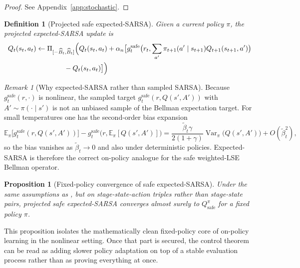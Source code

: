 \documentclass{article}
\newtheorem{proposition}[proposition]{Proposition}
\newtheorem{definition}[definition]{Definition}
\theoremstyle{remark}
\newtheorem{remark}[remark]{Remark}
\DeclareMathOperator{\Var}{Var}
\newcommand{\E}{\mathbb{E}}
\newcommand{\safe}{\mathrm{safe}}
\newcommand{\Bhat}{\widehat B}
\begin{document}
\begin{proof}
See Appendix~\ref{app:stochastic}.
\end{proof}

\begin{definition}[Projected safe expected-SARSA]
\label{def:lse-sarsa}
Given a current policy $\pi$, the projected expected-SARSA update is
\begin{equation}
\begin{aligned}
Q_t(s_t,a_t)
&\leftarrow
\Pi_{[-\Bhat_t,\Bhat_t]}
\Bigl(
Q_t(s_t,a_t) + \alpha_n\bigl[
    g_t^{\safe}\bigl(r_t,\sum_{a'}\pi_{t+1}(a'\mid s_{t+1})Q_{t+1}(s_{t+1},a')\bigr) \\
&\qquad\qquad
    - Q_t(s_t,a_t)
\bigr]
\Bigr)
\end{aligned}
\label{eq:safe-sarsa}
\end{equation}
\end{definition}

\begin{remark}[Why expected-SARSA rather than sampled SARSA]
\label{rem:expected-sarsa}
Because $g_t^{\safe}(r,\cdot)$ is nonlinear, the sampled target $g_t^{\safe}(r,Q(s',A'))$ with $A'\sim\pi(\cdot\mid s')$ is not an unbiased sample of the Bellman expectation target.
For small temperatures one has the second-order bias expansion
\begin{equation}
\E_\pi\bigl[g_t^{\safe}(r,Q(s',A'))\bigr] - g_t^{\safe}\bigl(r,\E_\pi[Q(s',A')]\bigr)
=
\frac{\widetilde\beta_t\gamma}{2(1+\gamma)}\Var_\pi\!\bigl(Q(s',A')\bigr) + O(\widetilde\beta_t^2),
\label{eq:sarsa-bias}
\end{equation}
so the bias vanishes as $\widetilde\beta_t\to 0$ and also under deterministic policies.
Expected-SARSA is therefore the correct on-policy analogue for the safe weighted-LSE Bellman operator.
\end{remark}

\begin{proposition}[Fixed-policy convergence of safe expected-SARSA]
\label{prop:expected-sarsa-eval}
Under the same assumptions as , but on stage-state-action triples rather than stage-state pairs, projected safe expected-SARSA converges almost surely to $Q_\safe^{\pi}$ for a fixed policy $\pi$.
\end{proposition}

This proposition isolates the mathematically clean fixed-policy core of on-policy learning in the nonlinear setting.
Once that part is secured, the control theorem can be read as adding slower policy adaptation on top of a stable evaluation process rather than as proving everything at once.
\end{document}
